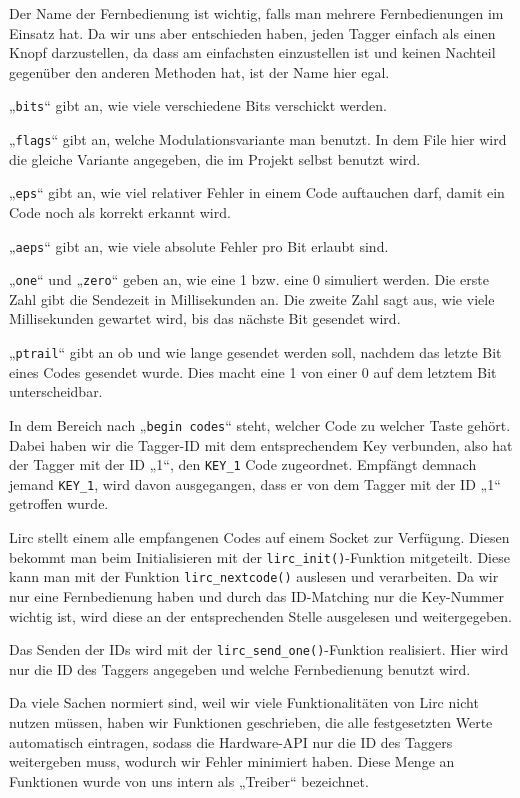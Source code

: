 Der Name der Fernbedienung ist wichtig, falls man mehrere Fernbedienungen im Einsatz hat. Da wir uns aber entschieden haben,
jeden Tagger einfach als einen Knopf darzustellen, da dass am einfachsten einzustellen ist und keinen Nachteil
gegenüber den anderen Methoden hat, ist der Name hier egal.

„\texttt{bits}“ gibt an, wie viele verschiedene Bits verschickt werden.

„\texttt{flags}“ gibt an, welche Modulationsvariante man benutzt. In dem File hier wird die gleiche Variante angegeben,
die im Projekt selbst benutzt wird.

„\texttt{eps}“ gibt an, wie viel relativer Fehler in einem Code auftauchen darf, damit ein Code noch als korrekt erkannt wird.

„\texttt{aeps}“ gibt an, wie viele absolute Fehler pro Bit erlaubt sind.

„\texttt{one}“ und „\texttt{zero}“ geben an, wie eine 1 bzw. eine 0 simuliert werden.
Die erste Zahl gibt die Sendezeit in Millisekunden an. Die zweite Zahl sagt aus, wie viele Millisekunden gewartet wird,
bis das nächste Bit gesendet wird.

„\texttt{ptrail}“ gibt an ob und wie lange gesendet werden soll, nachdem das letzte Bit eines Codes gesendet wurde. 
Dies macht eine 1 von einer 0 auf dem letztem Bit unterscheidbar.

In dem Bereich nach „\texttt{begin codes}“ steht, welcher Code zu welcher Taste gehört. Dabei haben wir die Tagger-ID mit dem
entsprechendem Key verbunden, also hat der Tagger mit der ID „1“, den \texttt{KEY_1} Code zugeordnet. Empfängt demnach
jemand \texttt{KEY_1}, wird davon ausgegangen, dass er von dem Tagger mit der ID „1“ getroffen wurde.

Lirc stellt einem alle empfangenen Codes auf einem Socket zur Verfügung. Diesen bekommt man beim Initialisieren mit der
\texttt{lirc\_init()}-Funktion mitgeteilt.
Diese kann man mit der Funktion \texttt{lirc\_nextcode()} auslesen und verarbeiten. Da wir nur eine Fernbedienung haben
und durch das ID-Matching nur die Key-Nummer wichtig ist, wird diese an der entsprechenden Stelle ausgelesen und weitergegeben.

Das Senden der IDs wird mit der \texttt{lirc\_send\_one()}-Funktion realisiert. Hier wird nur die ID des Taggers angegeben
und welche Fernbedienung benutzt wird.

Da viele Sachen normiert sind, weil wir viele Funktionalitäten von Lirc nicht nutzen müssen, haben wir Funktionen geschrieben,
die alle festgesetzten Werte automatisch eintragen, sodass die Hardware-API nur die ID des Taggers weitergeben muss,
wodurch wir Fehler minimiert haben. Diese Menge an Funktionen wurde von uns intern als „Treiber“ bezeichnet.
